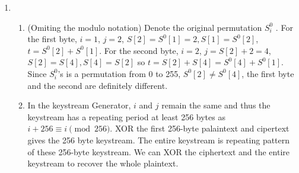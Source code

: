 \documentclass[12pt]{article}
\begin{document}
\begin{enumerate}
\item
\begin{enumerate}
\item
(Omiting the modulo notation) Denote the original permutation $S^0_i$ . For the first byte, $i=1$, $j=2$, $S[2]=S^0[1]=2, S[1]=S^0[2]$, $t=S^0[2]+S^0[1]$.
For the second byte, $i=2$, $j=S[2]+2=4$, $S[2]=S[4], S[4]=S[2]$ so $t=S[2]+S[4]=S^0[4]+S^0[1]$. Since $S^0_i$'s is a permutation from 0 to 255, $S^0[2] \neq S^0[4]$, the first byte and the second are definitely different.
\item
In the keystream Generator, $i$ and $j$ remain the same and thus the keystream has a repeating period at least 256 bytes as $i+256 \equiv i \pmod{256}$. XOR the first 256-byte palaintext and cipertext gives the 256 byte keystream. The entire keystream is repeating pattern of these 256-byte keystream. We can XOR the ciphertext and the entire keystream to recover the whole plaintext.
\end{enumerate}
\end{enumerate}
\end{document}
